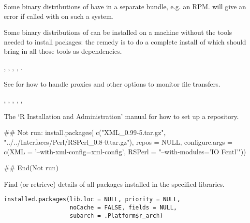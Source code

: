 %
\begin{Note}\relax
Some binary distributions of \R{} have  in a separate
bundle, e.g. an  RPM.   will
give an error if called with  on such a system.

Some binary distributions of \R{} can be installed on a machine without the
tools needed to install packages: the remedy is to do a complete
install of \R{} which should bring in all those tools as dependencies.
\end{Note}
%
\begin{SeeAlso}\relax
{},
,
,
,
.

See  for how to handle proxies and
other options to monitor file transfers.

, , ,
, , 

The `R Installation and Administration' manual for how to 
set up a repository.
\end{SeeAlso}
%
\begin{Examples}
\begin{ExampleCode}

## Not run: 
install.packages(
    c("XML_0.99-5.tar.gz",
      "../../Interfaces/Perl/RSPerl_0.8-0.tar.gz"),
    repos = NULL,
    configure.args = c(XML = '--with-xml-config=xml-config',
                       RSPerl = "--with-modules='IO Fcntl'"))

## End(Not run)
\end{ExampleCode}
\end{Examples}
%
\begin{Description}\relax
Find (or retrieve) details of all packages installed in the specified
libraries.
\end{Description}
%
\begin{Usage}
\begin{verbatim}
installed.packages(lib.loc = NULL, priority = NULL,
                   noCache = FALSE, fields = NULL,
                   subarch = .Platform$r_arch)
\end{verbatim}
\end{Usage}
